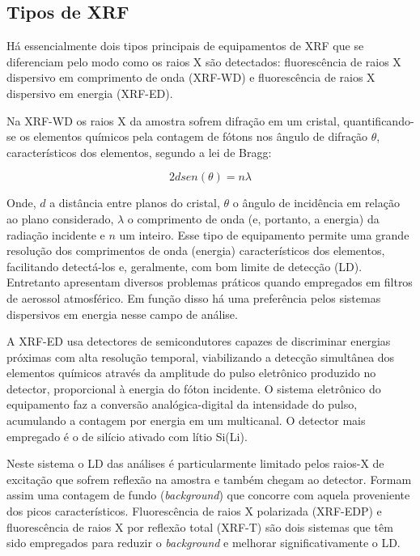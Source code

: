 \subsection{Tipos de XRF}

Há essencialmente dois tipos principais de equipamentos de XRF que se 
diferenciam pelo modo como os raios X são detectados: fluorescência de raios 
X dispersivo em comprimento de onda (XRF-WD) e fluorescência de raios X 
dispersivo em energia (XRF-ED).

Na XRF-WD os raios X da amostra sofrem difração em um cristal, quantificando-se
os elementos químicos pela contagem de fótons nos ângulo de difração $\theta$, 
característicos dos elementos, segundo a lei de Bragg:

\begin{equation}
	\label{eq:bragg}
	2d sen(\theta) = n \lambda
\end{equation}

Onde, $d$ a distância entre planos do cristal, $\theta$ o ângulo de incidência 
em relação ao plano considerado, $\lambda$ o comprimento de onda 
(e, portanto, a energia) da radiação incidente e $n$ um inteiro.
Esse tipo de equipamento permite uma grande resolução dos comprimentos de onda 
(energia) característicos dos elementos, facilitando detectá-los e, geralmente, 
com bom limite de detecção (LD).
Entretanto apresentam diversos problemas práticos quando empregados em filtros 
de aerossol atmosférico. Em função disso há uma preferência pelos sistemas 
dispersivos em energia nesse campo de análise. 

A XRF-ED usa detectores de semicondutores capazes de discriminar energias 
próximas com alta resolução temporal, viabilizando a detecção simultânea dos 
elementos químicos através da amplitude do pulso eletrônico produzido no 
detector, proporcional à energia do fóton incidente. O sistema eletrônico do 
equipamento faz a conversão analógica-digital da intensidade do pulso, 
acumulando a contagem por energia em um multicanal. O detector mais empregado é 
o de silício ativado com lítio Si(Li). 

Neste sistema o LD das análises é particularmente limitado pelos raios-X de 
excitação que sofrem reflexão na amostra e também chegam ao detector. 
Formam assim uma contagem de fundo (\textit{background}) que concorre com 
aquela proveniente dos picos característicos. 
Fluorescência de raios X polarizada (XRF-EDP) e fluorescência de raios X por 
reflexão total (XRF-T) são dois sistemas que têm sido empregados 
para reduzir o \textit{background} e melhorar significativamente o LD.

